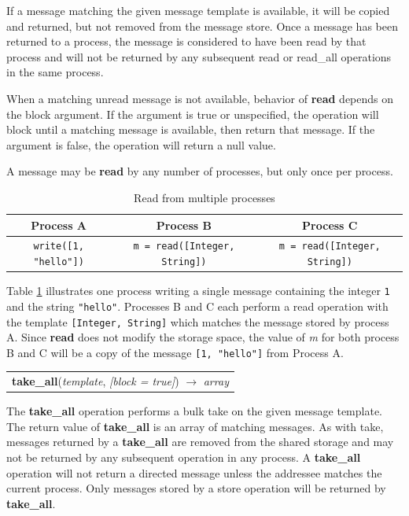 \documentclass[lnicst]{svmultln}
\begin{document}
If a message matching the given message template is available, it will be copied and returned, but not removed from the message store. Once a message has been returned to a process, the message is considered to have been read by that process and will not be returned by any subsequent read or read\_all operations in the same process.

When a matching unread message is not available, behavior of \textbf{read} depends on the block argument. If the argument is true or unspecified, the operation will block until a matching message is available, then return that message. If the argument is false, the operation will return a null value.

A message may be \textbf{read} by any number of processes, but only once per process.

\begin{table}
\centering
\caption{Read from multiple processes}
\begin{tabular}{|c|c|c|} \hline
\textbf{Process A} & \textbf{Process B} & \textbf{Process C} \\ \hline
\texttt{write([1, "hello"])} & \texttt{m = read([Integer, String])} & \texttt{m = read([Integer, String])} \\ \hline
\end{tabular}
\label{fig:readprocesses}
\end{table}

    Table \ref{fig:readprocesses} illustrates one process writing a single message containing the integer \texttt{1} and the string \texttt{"hello"}. Processes B and C each perform a read operation with the template \texttt{[Integer, String]} which matches the message stored by process A. Since \textbf{read} does not modify the storage space, the value of \textit{m} for both process B and C will be a copy of the message \texttt{[1, "hello"]} from Process A.

\begin{table}
\begin{tabular}{c}
\textbf{take\_all}(\textit{template}, \textit{[block = true]}) $\rightarrow$ \textit{array}
\end{tabular}
\end{table}

    The \textbf{take\_all} operation performs a bulk take on the given message template. The return value of \textbf{take\_all} is an array of matching messages. As with take, messages returned by a \textbf{take\_all} are removed from the shared storage and may not be returned by any subsequent operation in any process. A \textbf{take\_all} operation will not return a directed message unless the addressee matches the current process. Only messages stored by a store operation will be returned by \textbf{take\_all}.
\end{document}
